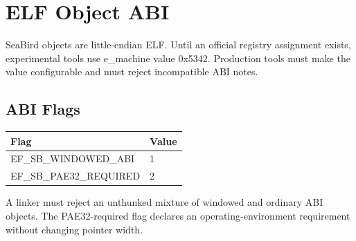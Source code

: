 \documentclass[10pt]{article}
\begin{document}
\section{ELF Object ABI}
SeaBird objects are little-endian ELF. Until an official registry assignment exists, experimental tools use e\_machine value 0x5342. Production tools must make the value configurable and must reject incompatible ABI notes.
\subsection{ABI Flags}
\begin{longtable}{@{}L{4.5cm}L{2cm}@{}}
\toprule Flag & Value \\ \midrule
EF\_\allowbreak{}SB\_\allowbreak{}WINDOWED\_\allowbreak{}ABI & 1 \\
EF\_\allowbreak{}SB\_\allowbreak{}PAE32\_\allowbreak{}REQUIRED & 2 \\
\bottomrule\end{longtable}
A linker must reject an unthunked mixture of windowed and ordinary ABI objects. The PAE32-required flag declares an operating-environment requirement without changing pointer width.
\end{document}

